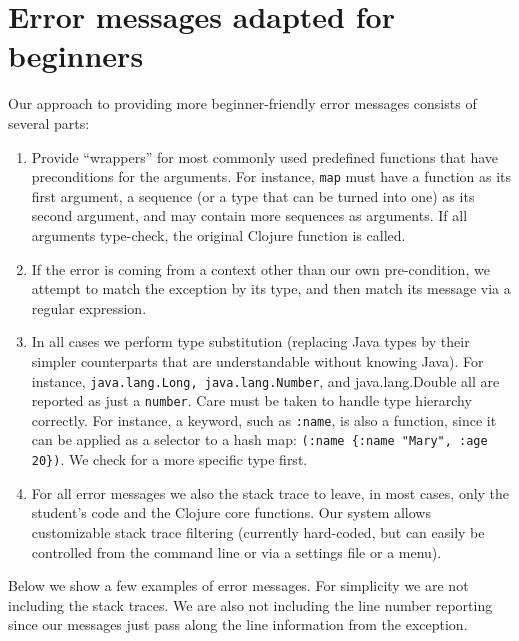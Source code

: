 \documentclass[submission,copyright,creativecommons]{eptcs}
\newcommand{\allcomments}[1]{{#1}}
\newcommand{\hfcomment}[1]{\textcolor{Teal}{\allcomments{Henry: {#1}}}}
\begin{document}
\section{Error messages adapted for beginners}\label{sec:errors-work}
Our approach to providing more beginner-friendly error messages consists of several parts:
\begin{enumerate}
\item Provide ``wrappers'' for most commonly used predefined functions that have preconditions
for the arguments. For instance, {\tt map} must have a function as its first argument, a sequence 
(or a type that can be turned into one) as its second argument, 
and may contain more sequences as  arguments. 
If all arguments type-check, the original Clojure function is called. 
\item If the error is coming from a context other than our own pre-condition, we attempt to match the exception by its
type, and then match its message via a regular expression. 
\item In all cases we perform type substitution (replacing Java types by their simpler counterparts that are 
understandable without knowing Java). For instance, {\tt java.lang.Long, java.lang.Number}, and
{java.lang.Double} all are reported as just a {\tt number}. Care must be taken to handle type hierarchy correctly. For instance, a keyword, such as {\tt :name}, is also a function, since 
it can be applied as a selector to a hash map: {\tt (:name \{:name "Mary", :age 20\})}. We check for a more specific type first.
\item For all error messages we also the stack trace to leave, in most cases, only the student's code and the Clojure core functions. 
Our system allows customizable stack trace filtering (currently hard-coded, but can easily be controlled from the command line or via a 
settings file or a menu). 
\end{enumerate}
Below we show a few examples of error messages. For simplicity we are not including the stack traces. We are also not
including the line number reporting since our messages just pass along the line information from the exception. 

\end{document}
